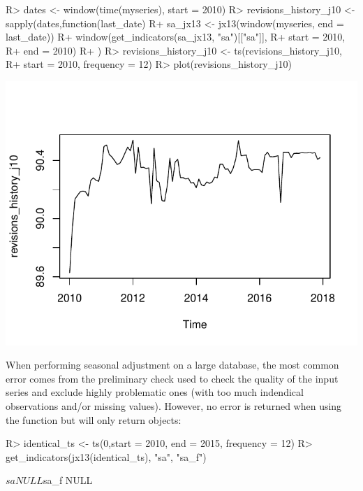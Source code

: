\documentclass[article]{jss}
\begin{document}
\begin{CodeChunk}

\begin{CodeInput}
R> dates <- window(time(myseries), start = 2010)
R> revisions_history_j10 <- sapply(dates,function(last_date){
R+   sa_jx13 <- jx13(window(myseries, end = last_date))
R+   window(get_indicators(sa_jx13, "sa")[["sa"]],
R+          start = 2010,
R+          end = 2010)
R+ })
R> revisions_history_j10 <- ts(revisions_history_j10,
R+                             start = 2010, frequency = 12)
R> plot(revisions_history_j10)
\end{CodeInput}


\begin{center}\includegraphics{img/img-unnamed-chunk-28-1} \end{center}

\end{CodeChunk}

When performing seasonal adjustment on a large database, the most common
error comes from the preliminary check used to check the quality of the
input series and exclude highly problematic ones (with too much
indendical observations and/or missing values). However, no error is
returned when using the  function but
 will only return  objects:

\begin{CodeChunk}

\begin{CodeInput}
R> identical_ts <- ts(0,start = 2010, end = 2015, frequency = 12)
R> get_indicators(jx13(identical_ts), "sa", "sa_f")
\end{CodeInput}

\begin{CodeOutput}
$sa
NULL

$sa_f
NULL
\end{CodeOutput}
\end{CodeChunk}
\end{document}
